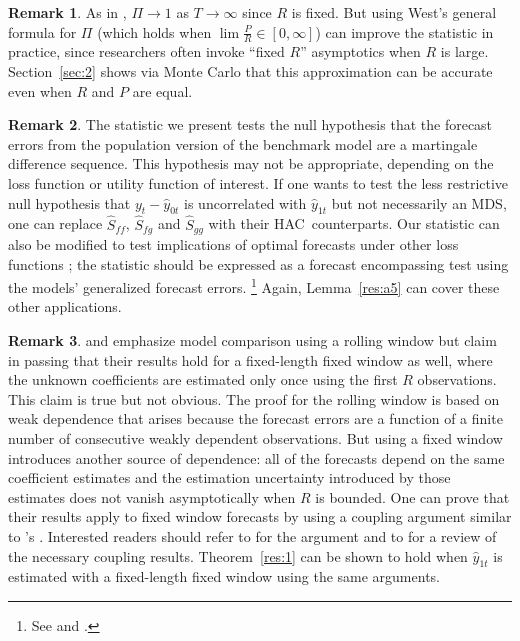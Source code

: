 \documentclass[12pt,fleqn]{article}
\newcommand\citepos[2][]{\citeauthor{#2}'s \citeyearpar[#1]{#2}}
\theoremstyle{definition}
\newtheorem{rem}{Remark}
\newcommand{\hac}{HAC}
\newcommand{\mds}{MDS}
\begin{document}
\begin{rem}
  As in \citet{Wes:96}, $\Pi \to 1$ as $T \to \infty$ since $R$ is
  fixed.  But using West's general formula for $\Pi$ (which holds when
  $\lim \tfrac{P}{R} \in [0,\infty]$) can improve the statistic in practice,
  since researchers often invoke ``fixed $R$'' asymptotics when $R$ is
  large.  Section~\ref{sec:2} shows via Monte Carlo that this
  approximation can be accurate even when $R$ and $P$ are equal.
\end{rem}

\begin{rem}
  The statistic we present tests the null hypothesis that the forecast
  errors from the population version of the benchmark model are a
  martingale difference sequence.  This hypothesis may not be
  appropriate, depending on the loss function or utility function of
  interest.  If one wants to test the less restrictive null hypothesis that
  $y_{t} - \hat{y}_{0t}$ is uncorrelated with $\hat{y}_{1t}$ but not
  necessarily an \mds, one can replace $\hat{S}_{ff}$, $\hat{S}_{fg}$
  and $\hat{S}_{gg}$ with their \hac\ counterparts.  
  Our statistic can also be modified to test implications of
  optimal forecasts under other loss functions
  \citep[see][]{PaT:07,PaT:07b}; the statistic should be expressed as
  a forecast encompassing test using the models' generalized forecast
  errors.%
\footnote{See \citet{HLN:98} and \citet[Section~4]{ClW:07}.} %
  Again, Lemma~\ref{res:a5} can cover these other applications.
\end{rem}

\begin{rem}
  \citet{GiW:06} and \citet{ClW:06,ClW:07} emphasize model comparison
  using a rolling window but claim in passing that their results hold
  for a fixed-length fixed window as well, where the unknown
  coefficients are estimated only once using the first $R$
  observations.  This claim is true but not obvious.  The proof for
  the rolling window is based on weak dependence that arises because
  the forecast errors are a function of a finite number of consecutive
  weakly dependent observations.  But using a fixed window introduces
  another source of dependence: all of the forecasts depend on the
  same coefficient estimates and the estimation uncertainty introduced
  by those estimates does not vanish asymptotically when $R$ is bounded.  One can
  prove that their results apply to fixed window forecasts by using a
  coupling argument similar to \citepos{Cal:11}.  Interested readers
  should refer to \citet{Cal:11} for the argument and to
  \citet{MeP:02} for a review of the necessary coupling results.
  Theorem~\ref{res:1} can be shown to hold when $\hat y_{1t}$ is
  estimated with a fixed-length fixed window using the same arguments.
\end{rem}
\end{document}
